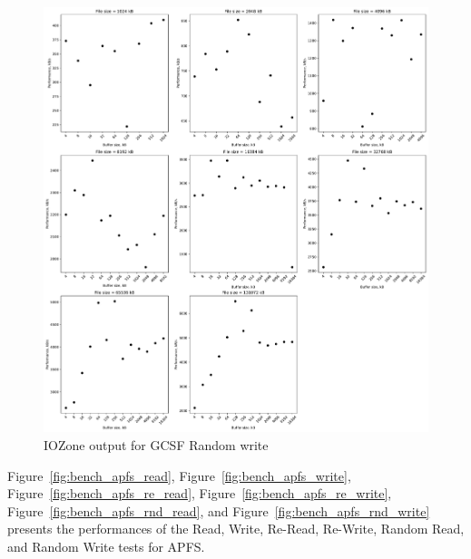 \begin{figure}[!htb]
	\label{fig:bench_gcsf_rnd_write}
	\begin{center}
		\includegraphics[width=1.0\textwidth]{figures/benchmarking/gcsf/Random write.pdf}
	\end{center}
	\caption{IOZone output for GCSF Random write}
\end{figure}

\FloatBarrier

Figure~\ref{fig:bench_apfs_read}, Figure~\ref{fig:bench_apfs_write}, Figure~\ref{fig:bench_apfs_re_read}, Figure~\ref{fig:bench_apfs_re_write}, Figure~\ref{fig:bench_apfs_rnd_read}, and Figure~\ref{fig:bench_apfs_rnd_write} presents the performances of the Read, Write, \mbox{Re-Read}, \mbox{Re-Write}, Random Read, and Random Write tests for \gls{APFS}.

